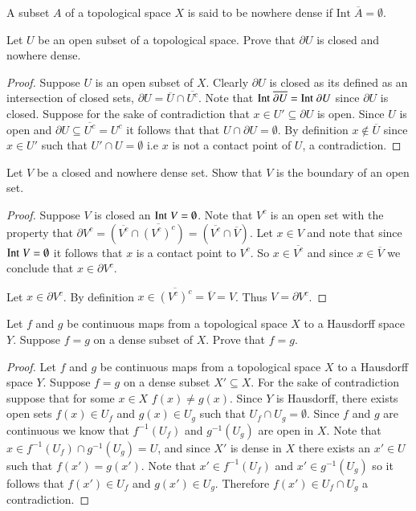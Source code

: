 \documentclass{homework651}
\begin{document}
\begin{problems}
\problem A subset $A$ of a topological space $X$ is said to be nowhere dense if $\mathrm{Int}\; \overline{A} = \emptyset$.
\begin{subproblems}
\item Let $U$ be an open subset of a topological space. Prove that $\partial U$ is closed and nowhere dense.
\begin{proof} Suppose $U$ is an open subset of $X$. Clearly $\partial U$ is closed as its defined as an intersection of 
    closed sets, $\partial U = \overline{U} \cap \overline{U^c}$. Note that $\mathrm{Int}\; \overline{\partial U} = \mathrm{Int}\; \partial U$ since $\partial U$ is closed.
    Suppose for the sake of contradiction that $x \in U' \subseteq \partial U$ is open. Since $U$ is open and $\partial U \subseteq \overline{U^c} = U^c$ it follows that that $U \cap \partial U = \emptyset$. 
    By definition $x \not \in \overline{U}$ since $x \in U'$ such that $U'\cap U = \emptyset$ i.e $x$ is not a contact point of $U$, a contradiction.
\end{proof}
\item Let $V$ be a closed and nowhere dense set. Show that $V$ is the boundary of an open set.
\begin{proof}
    Suppose $V$ is closed an $\mathrm{Int}\; V = \emptyset$. Note that $V^c$ is an open set with the property that $\partial V^c = (\overline{V^c} \cap \overline{(V^c)^c}) = (\overline{V^c} \cap \overline{V})$. 
    Let $x \in V$ and note that since $\mathrm{Int}\; V = \emptyset$ it follows that $x$ is 
    a contact point to $V^c$. So $x \in \overline{V^c}$ and since $x \in \overline{V}$ we conclude that $x \in \partial V^c$.
    
    Let $x \in \partial V^c$. By definition $x \in \overline{(V^c)^c} = \overline{V} = V$. Thus $V = \partial V^c$.
\end{proof}
\end{subproblems}


\problem Let $f$ and $g$ be continuous maps from a topological space $X$ to a Hausdorff
space $Y$.  Suppose $f=g$ on a dense subset of $X$. Prove that $f=g$. 
\begin{proof} Let $f$ and $g$ be continuous maps from a topological space $X$ to a Hausdorff
    space $Y$.  Suppose $f=g$ on a dense subset $X' \subseteq X$. For the sake of contradiction suppose that for some $x \in X$ $f(x) \neq g(x)$. 
    Since $Y$ is Hausdorff, there exists open sets $f(x) \in U_f$ and $g(x) \in U_g$ such that $U_f \cap U_g = \emptyset$. Since $f$ and $g$ are continuous 
    we know that $f^{-1}(U_f)$ and $g^{-1}(U_g)$ are open in $X$. Note that $x \in f^{-1}(U_f) \cap g^{-1}(U_g) = U$, and since $X'$ is dense in $X$ there exists an $x' \in U$
    such that $f(x') = g(x')$. Note that $x' \in f^{-1}(U_f)$ and $x' \in g^{-1}(U_g)$ so it follows that $f(x') \in U_f$ and $g(x') \in U_g$. Therefore $f(x') \in U_f \cap U_g$ a contradiction. 
\end{proof}






\end{problems}
\end{document}
